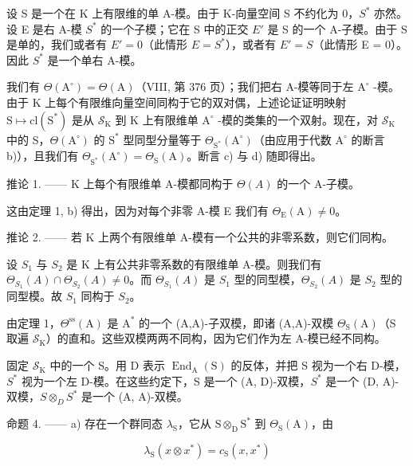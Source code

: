 设 S 是一个在 K 上有限维的单 A-模。由于 K-向量空间 S 不约化为 0，\(S^{*}\) 亦然。设 E 是右 A-模 \(S^{*}\) 的一个子模；它在 S 中的正交 \(E'\) 是 S 的一个 A-子模。由于 S 是单的，我们或者有 \(E' = 0\)（此情形 \(E = S^{*}\)），或者有 \(E' = S\)（此情形 E = 0）。因此 \(S^{*}\) 是一个单右 A-模。

我们有 \(\Theta (\mathrm{A}^{\circ}) = \Theta (\mathrm{A})\)（VIII, 第 376 页）；我们把右 A-模等同于左 \(\mathrm{A}^{\circ}\) -模。由于 K 上每个有限维向量空间同构于它的双对偶，上述论证证明映射 \(\mathrm{S}\mapsto \mathrm{cl}(\mathrm{S}^{*})\) 是从 \(\mathcal{S}_{\mathrm{K}}\) 到 K 上有限维单 \(\mathrm{A}^{\circ}\) -模的类集的一个双射。现在，对 \(\mathcal{S}_{\mathrm{K}}\) 中的 S，\(\Theta (\mathrm{A}^{\circ})\) 的 \(\mathrm{S}^*\) 型同型分量等于 \(\Theta_{\mathrm{S}^*}(\mathrm{A}^{\circ})\)（由应用于代数 \(\mathrm{A}^{\circ}\) 的断言 b)），且我们有 \(\Theta_{\mathrm{S}^*}(\mathrm{A}^{\circ}) = \Theta_{\mathrm{S}}(\mathrm{A})\)。断言 c) 与 d) 随即得出。

推论 1. —— K 上每个有限维单 A-模都同构于 \(\Theta(A)\) 的一个 A-子模。

这由定理 1, b) 得出，因为对每个非零 A-模 E 我们有 \(\Theta_{\mathrm{E}}(\mathrm{A}) \neq 0\)。

推论 2. —— 若 K 上两个有限维单 A-模有一个公共的非零系数，则它们同构。

设 \(S_{1}\) 与 \(S_{2}\) 是 K 上有公共非零系数的有限维单 A-模。则我们有 \(\Theta_{S_{1}}(A) \cap \Theta_{S_{2}}(A) \neq 0\)。而 \(\Theta_{S_{1}}(A)\) 是 \(S_{1}\) 型的同型模，\(\Theta_{S_{2}}(A)\) 是 \(S_{2}\) 型的同型模。故 \(S_{1}\) 同构于 \(S_{2}\)。

由定理 1，\(\Theta^{\mathrm{ss}}(\mathrm{A})\) 是 \(\mathrm{A}^*\) 的一个 (A,A)-子双模，即诸 (A,A)-双模 \(\Theta_{\mathrm{S}}(\mathrm{A})\)（S 取遍 \(\mathcal{S}_{\mathrm{K}}\)）的直和。这些双模两两不同构，因为它们作为左 A-模已经不同构。

固定 \(\mathcal{S}_{\mathrm{K}}\) 中的一个 S。用 D 表示 \(\operatorname{End}_{\mathrm{A}}(\mathrm{S})\) 的反体，并把 S 视为一个右 D-模，\(S^{*}\) 视为一个左 D-模。在这些约定下，S 是一个 (A, D)-双模，\(S^{*}\) 是一个 (D, A)-双模，\(S \otimes_{D} S^{*}\) 是一个 (A, A)-双模。

命题 4. —— a) 存在一个群同态 \(\lambda_{\mathrm{S}}\)，它从 \(\mathrm{S} \otimes_{\mathrm{D}} \mathrm{S}^{*}\) 到 \(\Theta_{\mathrm{S}}(\mathrm{A})\)，由

\[
\lambda_ {\mathrm{S}} (x \otimes x ^ {*}) = c _ {\mathrm{S}} (x, x ^ {*})\tag{6}
\]

